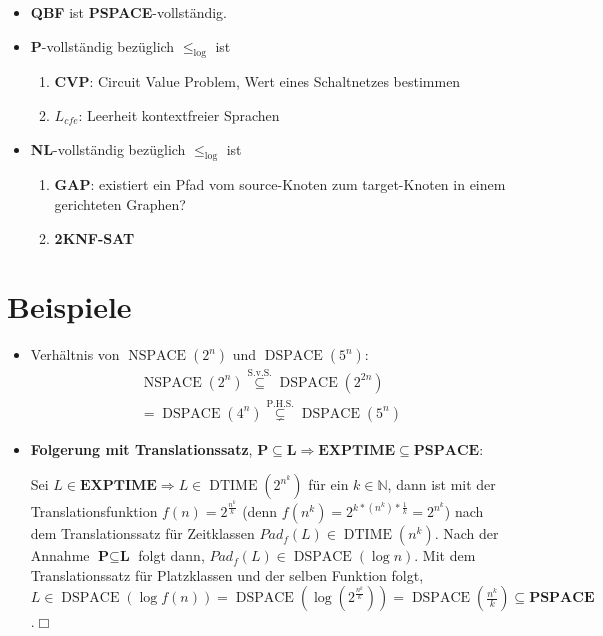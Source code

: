 \documentclass[landscape, 8pt, a4paper]{extarticle}
\newcommand{\poly}{\textbf{P}}
\newcommand{\N}{\mathbb{N}}
\begin{document}
\begin{multicols}{3}
\begin{itemize}
		\item \textbf{QBF} ist \textbf{PSPACE}-vollständig.

		\item \poly-vollständig bezüglich $\leq_{\log}$ ist
		\begin{enumerate}
			\item \textbf{CVP}: Circuit Value Problem, Wert eines Schaltnetzes bestimmen
			\item \textbf{$L_{cfe}$}: Leerheit kontextfreier Sprachen
		\end{enumerate}

		\item \textbf{NL}-vollständig bezüglich $\leq_{\log}$ ist
		\begin{enumerate}
			\item \textbf{GAP}: existiert ein Pfad vom source-Knoten zum target-Knoten in einem gerichteten Graphen?
			\item \textbf{2KNF-SAT}
		\end{enumerate}
	\end{itemize}





	\section{Beispiele}
	\begin{itemize}
		\item Verhältnis von $\operatorname{NSPACE}(2^n)$ und $\operatorname{DSPACE}(5^n)$:
		\begin{align*}
			\operatorname{NSPACE}(2^n)\overset{\text{S.v.S.}}\subseteq\operatorname{DSPACE}(2^{2n})\\
			=\operatorname{DSPACE}(4^n)\overset{\text{P.H.S.}}\subsetneq\operatorname{DSPACE}(5^n)
		\end{align*}
		\item \textbf{Folgerung mit Translationssatz}, $\poly\subseteq\textbf{L}\Rightarrow \textbf{EXPTIME}\subseteq\textbf{PSPACE}$:

		Sei $L\in\textbf{EXPTIME}\Rightarrow L\in \operatorname{DTIME}(2^{n^k})$ für ein $k\in\N$, dann ist mit der Translationsfunktion $f(n)=2^{\frac{n^k}{k}}$ (denn $f(n^k)=2^{k*(n^k)*\frac1k}=2^{n^k}$) nach dem Translationssatz für Zeitklassen $Pad_f(L)\in\operatorname{DTIME}(n^k)$.
		Nach der Annahme $\poly\subseteq\textbf{L}$ folgt dann, $Pad_f(L)\in\operatorname{DSPACE}(\log n)$.
		Mit dem Translationssatz für Platzklassen und der selben Funktion folgt, $L\in \operatorname{DSPACE}(\log f(n))=\operatorname{DSPACE}(\log (2^{\frac{n^k}{k}}))=\operatorname{DSPACE}(\frac{n^k}{k})\subseteq\textbf{PSPACE}$.\hfill$\Box$


\end{itemize}
\end{multicols}
\end{document}
